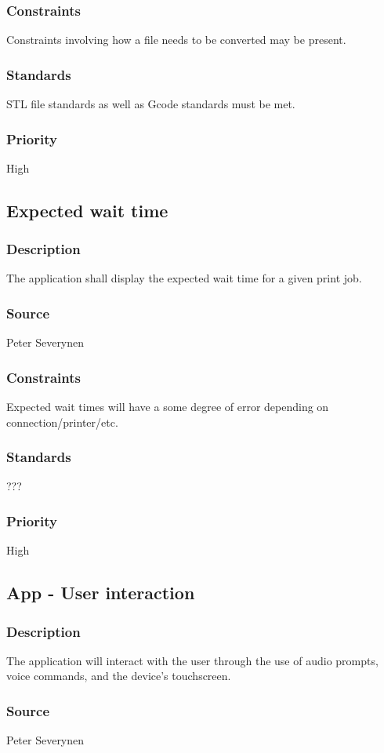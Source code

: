 \subsubsection{Constraints}
Constraints involving how a file needs to be converted may be present.
\subsubsection{Standards}
STL file standards as well as Gcode standards must be met.
\subsubsection{Priority}
High
\subsection{Expected wait time}
\subsubsection{Description}
The application shall display the expected wait time for a given print job.
\subsubsection{Source}
Peter Severynen
\subsubsection{Constraints}
Expected wait times will have a some degree of error depending on connection/printer/etc.
\subsubsection{Standards}
???
\subsubsection{Priority}
High
\subsection{App - User interaction}
\subsubsection{Description}
The application will interact with the user through the use of audio prompts, voice commands, and the device's touchscreen.
\subsubsection{Source}
Peter Severynen
